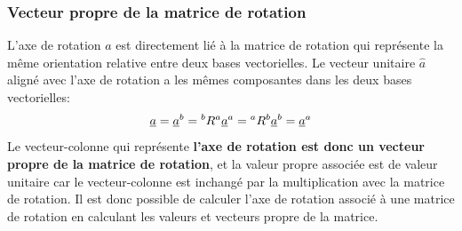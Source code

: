 \subsubsection{Vecteur propre de la matrice de rotation}
L'axe de rotation $\hat{a}$ est directement lié à la matrice de rotation qui représente la même orientation relative entre deux bases vectorielles. Le vecteur unitaire $\hat{a}$ aligné avec l'axe de rotation a les mêmes composantes dans les deux bases vectorielles:
\begin{equation}
\underline{a} = \underline{a}^b = {}^bR^a \underline{a}^a = {}^aR^b \underline{a}^b = \underline{a}^a
\end{equation} 
Le vecteur-colonne qui représente \textbf{l'axe de rotation est donc un vecteur propre de la matrice de rotation}, et la valeur propre associée est de valeur unitaire car le vecteur-colonne est inchangé par la multiplication avec la matrice de rotation. Il est donc possible de calculer l'axe de rotation associé à une matrice de rotation en calculant les valeurs et vecteurs propre de la matrice.

